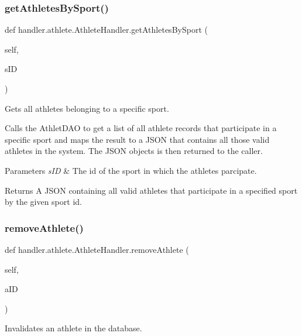 \subsubsection{\texorpdfstring{get\+Athletes\+By\+Sport()}{getAthletesBySport()}}
{\footnotesize\ttfamily def handler.\+athlete.\+Athlete\+Handler.\+get\+Athletes\+By\+Sport (\begin{DoxyParamCaption}\item[{}]{self,  }\item[{}]{s\+ID }\end{DoxyParamCaption})}



Gets all athletes belonging to a specific sport. 

Calls the Athlet\+D\+AO to get a list of all athlete records that participate in a specific sport and maps the result to a J\+S\+ON that contains all those valid athletes in the system. The J\+S\+ON objects is then returned to the caller.


\begin{DoxyParams}{Parameters}
{\em s\+ID} & The id of the sport in which the athletes parcipate.\\
\hline
\end{DoxyParams}
\begin{DoxyReturn}{Returns}
A J\+S\+ON containing all valid athletes that participate in a specified sport by the given sport id. 
\end{DoxyReturn}
\mbox{\label{classhandler_1_1athlete_1_1_athlete_handler_a9f3ea8fb6c3c156f89c2b2a5bda6e689}} 
\subsubsection{\texorpdfstring{remove\+Athlete()}{removeAthlete()}}
{\footnotesize\ttfamily def handler.\+athlete.\+Athlete\+Handler.\+remove\+Athlete (\begin{DoxyParamCaption}\item[{}]{self,  }\item[{}]{a\+ID }\end{DoxyParamCaption})}



Invalidates an athlete in the database. 

